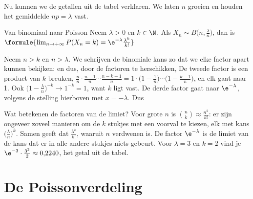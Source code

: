 Nu kunnen we de getallen uit de tabel verklaren. We laten $n$ groeien en houden het gemiddelde $np = \lambda$ vast.

\begin{theorie}
\begin{stelling}{Van binomiaal naar Poisson}
Neem $\lambda > 0$ en $k \in \N$. Als $X_n \sim B\bigl(n, \frac{\lambda}{n}\bigr)$, dan is \quad $\formule{\lim_{n \to +\infty} P(X_n = k) = \e^{-\lambda} \frac{\lambda^k}{k!}}$
\end{stelling}

\begin{bewijs}
Neem $n > k$ en $n > \lambda$. We schrijven de binomiale kans zo dat we elke factor apart kunnen bekijken:
en dus, door de factoren te herschikken,
De tweede factor is een product van $k$ breuken, $\frac{n}{n} \cdot \frac{n - 1}{n} \cdots \frac{n - k + 1}{n} = 1 \cdot \bigl(1 - \frac1n\bigr) \cdots \bigl(1 - \frac{k - 1}{n}\bigr)$, en elk gaat naar 1. Ook $\bigl(1 - \frac{\lambda}{n}\bigr)^{-k} \to 1^{-k} = 1$, want $k$ ligt vast. De derde factor gaat naar $\e^{-\lambda}$, volgens de stelling hierboven met $x = -\lambda$. Dus
\end{bewijs}
\end{theorie}

Wat betekenen de factoren van de limiet? Voor grote $n$ is $\binom{n}{k} \approx \frac{n^k}{k!}$: er zijn ongeveer zoveel manieren om de $k$ stukjes met een voorval te kiezen, elk met kans $\bigl(\frac{\lambda}{n}\bigr)^k$. Samen geeft dat $\frac{\lambda^k}{k!}$, waaruit $n$ verdwenen is. De factor $\e^{-\lambda}$ is de limiet van de kans dat er in alle andere stukjes niets gebeurt. Voor $\lambda = 3$ en $k = 2$ vind je $\e^{-3} \cdot \frac{3^2}{2} \approx 0{,}2240$, het getal uit de tabel.

\section{De Poissonverdeling}

